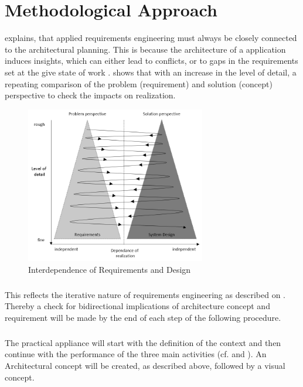 \chapter{Methodological Approach}
\textcite[22-23]{Pohl.2007} explains, that applied requirements engineering must always be closely connected to the architectural planning. This is because the architecture of a application induces insights, which can either lead to conflicts, or to gaps in the requirements set at the give state of work \parencites[22-23]{Pohl.2007}.  shows that with an increase in the level of detail, a repeating comparison of the problem (requirement) and solution (concept) perspective to check the impacts on realization.

\begin{figure}[H]
    \centering
    \includegraphics[width=0.7\textwidth]{img/iterative.png}
    \caption[Interdependence of Requirements and Design]{Interdependence of Requirements and Design \parencite[23]{Pohl.2007}}
    \label{fig:iterative}
\end{figure}

\paragraph{} This reflects the iterative nature of requirements engineering as described on . Thereby a check for bidirectional implications of architecture concept and requirement will be made by the end of each step of the following procedure.

\paragraph{} The practical appliance will start with the definition of the context and then continue with the performance of the three main activities (cf.  and ). An Architectural concept will be created, as described above, followed by a visual concept. 


